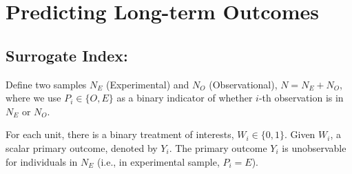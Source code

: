 \chapter{Predicting Long-term Outcomes}
\section{Surrogate Index: \cite{athey2019surrogate}}
Define two samples $N_E$ (Experimental) and $N_O$ (Observational), $N=N_E+N_O$, where we use $P_i\in\{O,E\}$ as a binary indicator of whether $i$-th observation is in $N_E$ or $N_O$.

For each unit, there is a binary treatment of interests, $W_i\in\{0,1\}$. Given $W_i$, a scalar primary outcome, denoted by $Y_i$. The primary outcome $Y_i$ is unobservable for individuals in $N_E$ (i.e., in experimental sample, $P_i=E$).